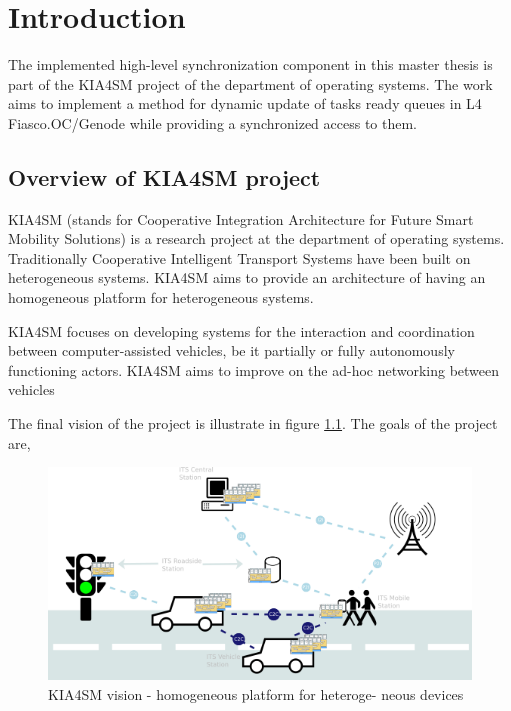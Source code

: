 \chapter{Introduction}
The implemented high-level synchronization component in this master thesis is part of the KIA4SM project of the department of operating systems. The work aims to implement a method for dynamic update of tasks ready queues in L4 Fiasco.OC/Genode while providing a synchronized access to them.



  

\section{Overview of KIA4SM project}

KIA4SM (stands for Cooperative Integration Architecture for Future Smart Mobility Solutions) is a research project at the department of operating systems. Traditionally Cooperative Intelligent Transport Systems have been built on heterogeneous systems. KIA4SM aims to provide an architecture of having an homogeneous platform for heterogeneous systems. 

KIA4SM focuses on developing systems for the interaction and coordination between
computer-assisted vehicles, be it partially or fully autonomously functioning actors.  KIA4SM aims to improve on the ad-hoc networking between vehicles

The final vision of the project is illustrate in figure \ref{kia4sm}. The goals of the project are,

\begin{figure}[kia4sm]
  \centering
  \includegraphics[scale = 1]{figures/kia4sm_vision.png}
  \caption{KIA4SM vision - homogeneous platform for heteroge-
  neous devices}\label{kia4sm}
\end{figure}

